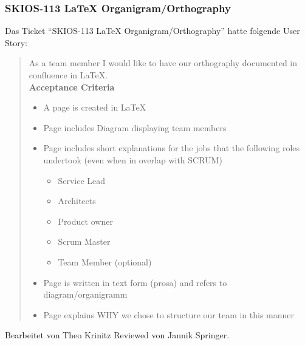 \subsubsection{SKIOS-113 LaTeX Organigram/Orthography}
Das Ticket \enquote{SKIOS-113 LaTeX Organigram/Orthography} hatte folgende User Story:
\begin{quotation}
    As a team member I would like to have our orthography documented in confluence in LaTeX. \\
\textbf{Acceptance Criteria}
\begin{itemize}
    \item A page is created in LaTeX
    \item Page includes Diagram displaying team members
    \item Page includes short explanations for the jobs that the following roles undertook (even when in overlap with SCRUM)
    \begin{itemize}
        \item Service Lead
        \item Architects
        \item Product owner
        \item Scrum Master
        \item Team Member (optional)
    \end{itemize}
    \item Page is written in text form (prosa) and refers to diagram/organigramm
    \item Page explains WHY we chose to structure our team in this manner   
\end{itemize}
\end{quotation}
Bearbeitet von Theo Krinitz
Reviewed von Jannik Springer.


